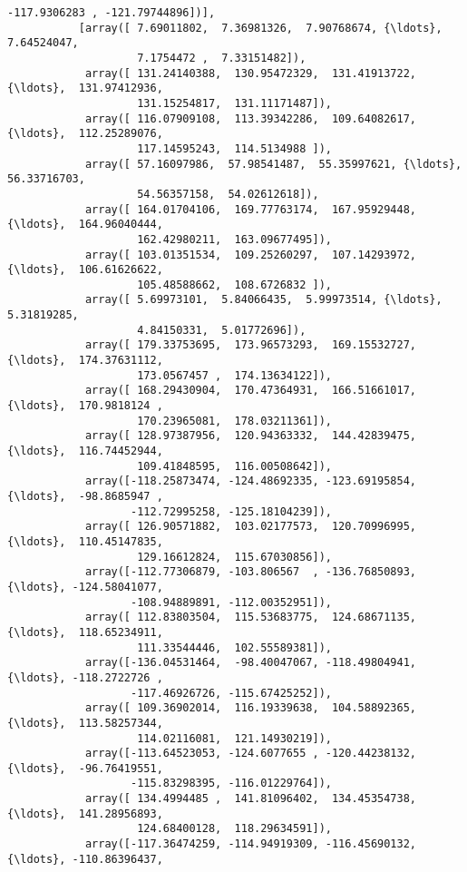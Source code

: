 \documentclass[11pt]{article}
\begin{document}
\begin{Verbatim}[commandchars=\\\{\}]
                   -117.9306283 , -121.79744896])],
           [array([ 7.69011802,  7.36981326,  7.90768674, {\ldots},  7.64524047,
                    7.1754472 ,  7.33151482]),
            array([ 131.24140388,  130.95472329,  131.41913722, {\ldots},  131.97412936,
                    131.15254817,  131.11171487]),
            array([ 116.07909108,  113.39342286,  109.64082617, {\ldots},  112.25289076,
                    117.14595243,  114.5134988 ]),
            array([ 57.16097986,  57.98541487,  55.35997621, {\ldots},  56.33716703,
                    54.56357158,  54.02612618]),
            array([ 164.01704106,  169.77763174,  167.95929448, {\ldots},  164.96040444,
                    162.42980211,  163.09677495]),
            array([ 103.01351534,  109.25260297,  107.14293972, {\ldots},  106.61626622,
                    105.48588662,  108.6726832 ]),
            array([ 5.69973101,  5.84066435,  5.99973514, {\ldots},  5.31819285,
                    4.84150331,  5.01772696]),
            array([ 179.33753695,  173.96573293,  169.15532727, {\ldots},  174.37631112,
                    173.0567457 ,  174.13634122]),
            array([ 168.29430904,  170.47364931,  166.51661017, {\ldots},  170.9818124 ,
                    170.23965081,  178.03211361]),
            array([ 128.97387956,  120.94363332,  144.42839475, {\ldots},  116.74452944,
                    109.41848595,  116.00508642]),
            array([-118.25873474, -124.48692335, -123.69195854, {\ldots},  -98.8685947 ,
                   -112.72995258, -125.18104239]),
            array([ 126.90571882,  103.02177573,  120.70996995, {\ldots},  110.45147835,
                    129.16612824,  115.67030856]),
            array([-112.77306879, -103.806567  , -136.76850893, {\ldots}, -124.58041077,
                   -108.94889891, -112.00352951]),
            array([ 112.83803504,  115.53683775,  124.68671135, {\ldots},  118.65234911,
                    111.33544446,  102.55589381]),
            array([-136.04531464,  -98.40047067, -118.49804941, {\ldots}, -118.2722726 ,
                   -117.46926726, -115.67425252]),
            array([ 109.36902014,  116.19339638,  104.58892365, {\ldots},  113.58257344,
                    114.02116081,  121.14930219]),
            array([-113.64523053, -124.6077655 , -120.44238132, {\ldots},  -96.76419551,
                   -115.83298395, -116.01229764]),
            array([ 134.4994485 ,  141.81096402,  134.45354738, {\ldots},  141.28956893,
                    124.68400128,  118.29634591]),
            array([-117.36474259, -114.94919309, -116.45690132, {\ldots}, -110.86396437,

\end{Verbatim}
\end{document}
